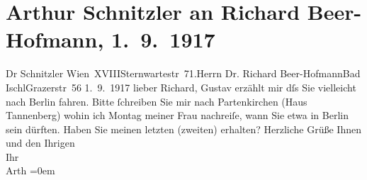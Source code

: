 

         
         \renewcommand{\erwaehntePersonen}{Personen: Richard Beer-Hofmann, Olga Schnitzler, Gustav Schwarzkopf}
         \renewcommand{\erwaehnteOrte}{Orte: Bad Ischl, Berlin, Grazer Straße, Haus Tannenberg, Partenkirchen, Sternwartestraße, Wien, XVIII., Währing}
         \renewcommand{\erwaehnteWerke}{}
               \section[Arthur Schnitzler an Richard Beer-Hofmann, 1. 9. 1917]{ Arthur Schnitzler an Richard Beer-Hofmann, 1. 9. 1917}\nopagebreak{}\rehead{ }\begin{ledgroupsized}[t]{13cm}\normalsize\beginnumbering \toendnotes[C]{\smallbreak\pagebreak[2]} 
\toendnotes[C]{\smallbreak}\pstart{}{\pb}Dr Schnitzler Wien XVIII\pend{}\pstart{}Sternwartestr 71.\pend{}{\bigskip}\pstart{}Herrn Dr. Richard Beer-Hofmann\pend{}\pstart{}Bad Ischl\pend{}\pstart{}Grazerstr 56\pend{}{\bigskip}\pstart
           \raggedleft{}{\pb}1. 9. 1917\pend
           \pstart
           lieber Richard,{ }Gustav erzählt mir dſs Sie vielleicht nach Berlin fahren. Bitte ſchreiben Sie mir nach Partenkirchen (Haus Tannenberg) wohin ich Montag meiner Frau nachreiſe, wann Sie etwa in Berlin sein dürften.\pend
           \pstart
           Haben Sie meinen letzten (zweiten) {\pb}\label{K_L02271-1v}\label{K_L02271-1h} erhalten?\pend
           \pstart
           Herzliche Grüße Ihnen und den Ihrigen{\\[\baselineskip]}Ihr{\\[\baselineskip]}\spacefill\mbox{Arth}\pend
           \leftskip=0em{}
         
         \endnumbering{}\end{ledgroupsized}  \newcommand{\dateiname}{L02271}\newcommand{\titel}{Arthur Schnitzler an Richard Beer-Hofmann, 1. 9. 1917}\newcommand{\editorInnen}{Martin Anton Müller und Gerd-Hermann Susen}
      